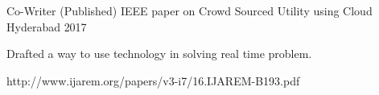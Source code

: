 

\begin{cventries}

  \cventry
    {Co-Writer} %
    {(Published) IEEE paper on Crowd Sourced Utility using Cloud} %
    {Hyderabad} %
    {2017} %
    {
      \begin{cvitems} %
        \item {Drafted a way to use technology in solving real time problem.}
        \item{http://www.ijarem.org/papers/v3-i7/16.IJAREM-B193.pdf}
      \end{cvitems}
    }



\end{cventries}
